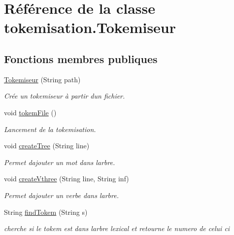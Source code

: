 \hypertarget{classtokemisation_1_1_tokemiseur}{}\section{Référence de la classe tokemisation.\+Tokemiseur}
\label{classtokemisation_1_1_tokemiseur}
\subsection*{Fonctions membres publiques}
\begin{DoxyCompactItemize}
\item 
\hyperlink{classtokemisation_1_1_tokemiseur_a0bedd0f61434a9597b87c674a52af8bf}{Tokemiseur} (String path)
\begin{DoxyCompactList}\small\item\em Crée un tokemiseur à partir d\textquotesingle{}un fichier. \end{DoxyCompactList}\item 
void \hyperlink{classtokemisation_1_1_tokemiseur_a1036e3bd17f10ac37b00142119495307}{tokem\+File} ()\hypertarget{classtokemisation_1_1_tokemiseur_a1036e3bd17f10ac37b00142119495307}{}\label{classtokemisation_1_1_tokemiseur_a1036e3bd17f10ac37b00142119495307}

\begin{DoxyCompactList}\small\item\em Lancement de la tokemisation. \end{DoxyCompactList}\item 
void \hyperlink{classtokemisation_1_1_tokemiseur_a9af268b22fd743447b689a27e0b0db3a}{create\+Tree} (String line)
\begin{DoxyCompactList}\small\item\em Permet d\textquotesingle{}ajouter un mot dans l\textquotesingle{}arbre. \end{DoxyCompactList}\item 
void \hyperlink{classtokemisation_1_1_tokemiseur_ae932be66d27c705438bb7e07036c2f52}{create\+Vthree} (String line, String inf)
\begin{DoxyCompactList}\small\item\em Permet d\textquotesingle{}ajouter un verbe dans l\textquotesingle{}arbre. \end{DoxyCompactList}\item 
String \hyperlink{classtokemisation_1_1_tokemiseur_a9aa1bbf145517a2b9b79461d8d831145}{find\+Tokem} (String s)
\begin{DoxyCompactList}\small\item\em cherche si le tokem est dans l\textquotesingle{}arbre lexical et retourne le numero de celui ci \end{DoxyCompactList}\end{DoxyCompactItemize}



